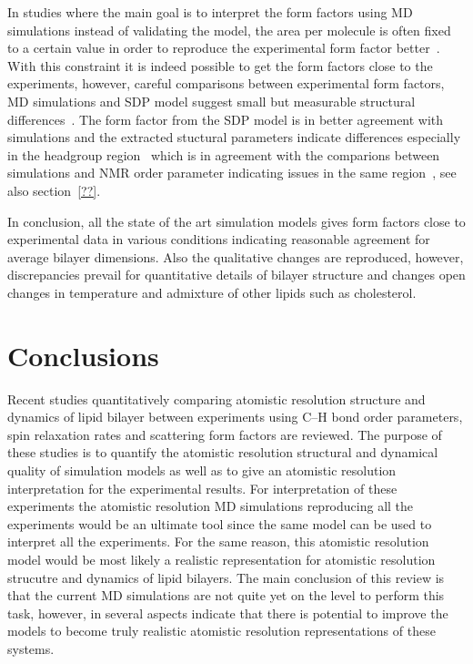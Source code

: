 \documentclass[aps,prl,superscriptaddress,twocolumn]{revtex4}
\begin{document}
In studies where the main goal is to interpret the form factors using MD simulations instead of validating the model,
the area per molecule is often fixed to a certain value in order to reproduce the experimental form factor 
better~\cite{sachs03,klauda06,kucerka08a,kucerka08b,braun13}.
With this constraint it is indeed possible to get the form factors close to the experiments, however, 
careful comparisons between experimental form factors, MD simulations and SDP model suggest small but measurable 
structural differences~\cite{kucerka08a,braun13}. The form factor from the SDP model is in better agreement
with simulations and the extracted stuctural parameters indicate differences especially in the headgroup region~\cite{kucerka08a,braun13} 
which is in agreement with the comparions between simulations and NMR order parameter indicating issues in the same region~\cite{botan15}, 
see also section~\ref{??}.

In conclusion, all the state of the art simulation models gives form factors close to experimental
data in various conditions indicating reasonable agreement for average bilayer dimensions. Also the qualitative changes are reproduced, however, 
discrepancies prevail for quantitative details of bilayer structure and changes open changes in temperature and admixture of other lipids such as cholesterol.


\onecolumngrid
{}
\twocolumngrid


\section{Conclusions}

Recent studies quantitatively comparing atomistic resolution structure and dynamics of lipid
bilayer between experiments using C--H bond order parameters, spin relaxation rates and
scattering form factors are reviewed. The purpose of these studies is to quantify the atomistic
resolution structural and dynamical quality of simulation models as well as to give an 
atomistic resolution interpretation for the experimental results. For interpretation of
these experiments the atomistic resolution MD simulations reproducing all the experiments would be
an ultimate tool since the same model can be used to interpret all the experiments. For the same 
reason, this atomistic resolution model would be most likely a realistic representation for
atomistic resolution strucutre and dynamics of lipid bilayers. The main conclusion of this
review is that the current MD simulations are not quite yet on the level to perform this task,
however, in several aspects indicate that there is potential to improve the models to become 
truly realistic atomistic resolution representations of these systems. 
\end{document}
